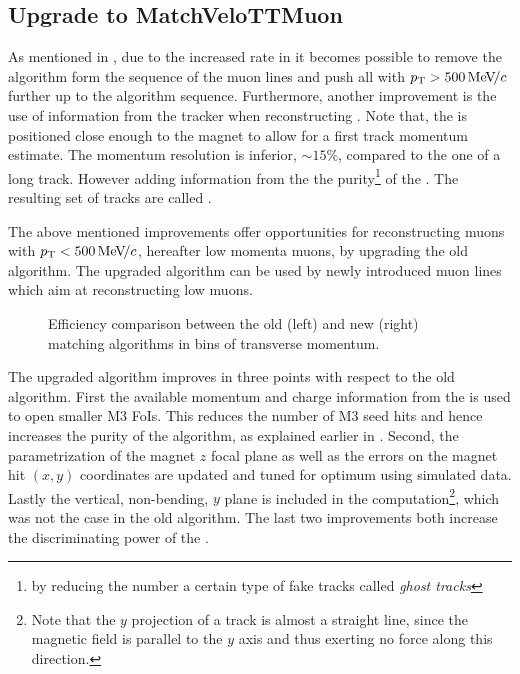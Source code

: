 \subsection{Upgrade to MatchVeloTTMuon}
\label{sec:matchvelottmuon}
As mentioned in , due to the increased \hltone rate in \runtwo it becomes possible to
remove the \mvm algorithm form the sequence of the \hltone muon lines and push all \veloTracks with
$\mbox{$p_{\rm T}$}>500 {\mathrm{\,Me\kern -0.1em V\!/}c}$ further up to the \hltone algorithm sequence. Furthermore, another improvement is the use of
information from the \ttracker tracker when reconstructing \veloTracks \cite{LHCb-PUB-2015-005}.
Note that, the \ttracker is positioned close enough to the \lhcb magnet to allow for a first track momentum estimate.
The \ttracker momentum resolution is inferior, $\sim 15\%$, compared to the one of a long track. However adding
information from the \ttracker the purity\footnote{by reducing the number a certain type of fake
tracks called {\it ghost tracks}}\cite{Bowen:2105078} of the \veloTracks. The resulting set of
tracks are called \veloTTracks.

The above mentioned improvements offer opportunities for reconstructing muons with $\mbox{$p_{\rm T}$}<500 {\mathrm{\,Me\kern -0.1em V\!/}c}$,
hereafter low momenta muons, by upgrading the old \mvm algorithm. The upgraded algorithm can be
used by newly introduced \hltone muon lines which aim at reconstructing low \pt muons.

\begin{figure}[t]
  \centering
  \begin{subfigure}{0.5\textwidth}
    \scalebox{.6}{}
    \caption{}
    \label{mvTTm_eff_p}
  \end{subfigure}%
  \hfill%
  \begin{subfigure}{0.5\textwidth}
    \scalebox{.6}{}
    \caption{}
    \label{mvm_eff_p}
  \end{subfigure}
  \caption{Efficiency comparison between the old (left) and new (right) matching algorithms in bins of transverse momentum.}
 \label{mvm_eff_pt_zoom_comp}
\end{figure}

The upgraded \mvTTm algorithm improves in three points with respect to the old \mvm algorithm.
First the available momentum and charge information from the \ttracker is used to open smaller M3 FoIs.
This reduces the number of M3 seed hits and hence increases the purity of the \mvTTm algorithm,
as explained earlier in .
Second, the parametrization of the magnet $z$ focal plane as well as the errors on the magnet hit
$(x,y)$ coordinates are updated and tuned for optimum using simulated data. Lastly the vertical,
non-bending, $y$ plane is included in the \chisq computation\footnote{Note that the $y$ projection
of a track is almost a straight line, since the magnetic field is parallel to the $y$ axis
and thus exerting no force along this direction.}, which was not the case in the old \mvm algorithm.
The last two improvements both increase the discriminating power of the \chisq.

